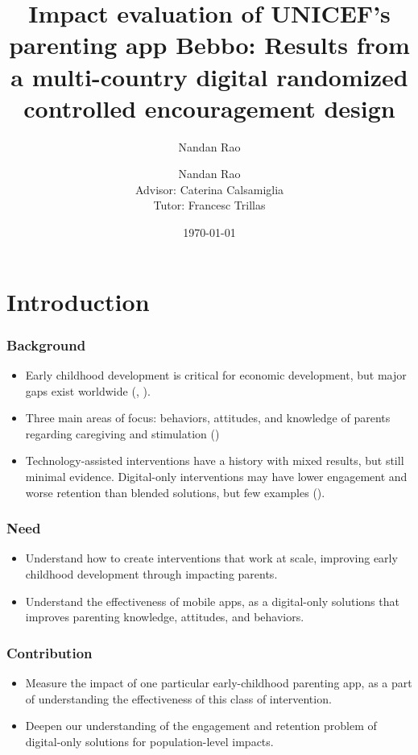 \documentclass[aspectratio=169]{beamer}
\title[title]{Impact evaluation of UNICEF’s parenting app Bebbo: Results from a multi-country digital randomized controlled encouragement design} %
\author[Nandan Rao]{Nandan Rao}
\author[me]{Nandan Rao\\[3mm]Advisor: Caterina Calsamiglia\\Tutor: Francesc Trillas}
\date[\today] {\today} %
\begin{document}
\begin{frame}
\titlepage
\end{frame}


\section{Introduction}

\begin{frame}
  \frametitle{Background}

  \begin{itemize}
  \item Early childhood development is critical for economic development, but  major gaps exist worldwide (\cite{Black2018}, \cite{Attanasio2022}).
  \item Three main areas of focus: behaviors, attitudes, and knowledge of parents regarding caregiving and stimulation (\cite{Britto2017})
  \item Technology-assisted interventions have a history with mixed results, but still minimal evidence. Digital-only interventions may have lower engagement and worse retention than blended solutions, but few examples (\cite{Hall2015}).
  \end{itemize}
\end{frame}


\begin{frame}
  \frametitle{Need}

  \begin{itemize}
  \item Understand how to create interventions that work at scale, improving early childhood development through impacting parents.
  \item Understand the effectiveness of mobile apps, as a digital-only solutions that improves parenting knowledge, attitudes, and behaviors.
  \end{itemize}
\end{frame}


\begin{frame}
  \frametitle{Contribution}

  \begin{itemize}
  \item Measure the impact of one particular early-childhood parenting app, as a part of understanding the effectiveness of this class of intervention.
  \item Deepen our understanding of the engagement and retention problem of digital-only solutions for population-level impacts.
  \end{itemize}
\end{frame}
\end{document}
